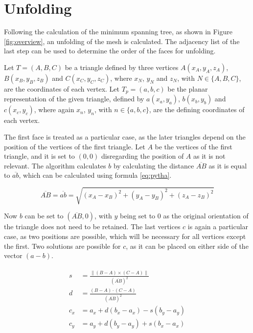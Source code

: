 \documentclass[draft,final]{vutinfth} %
\begin{document}
\section{Unfolding}
\label{sec:unfold}
Following the calculation of the minimum spanning tree, as shown in Figure \ref{fig:overview}, an unfolding of the mesh is calculated. The adjacency list of the last step can be used to determine the order of the faces for unfolding.

Let $T = (A,B,C)$ be a triangle defined by three vertices $A(x_A, y_A, z_A)$, $B(x_B, y_B, z_B)$ and $C(x_C, y_C, z_C)$, where $x_N$, $y_N$ and $z_N$, with $N \in \{A,B,C\}$, are the coordinates of each vertex. Let $T_p = (a, b, c)$ be the planar representation of the given triangle, defined by $a(x_a, y_a)$, $b(x_b, y_b)$ and $c(x_c, y_c)$, where again $x_n$, $y_n$, with $n \in \{a,b,c\}$, are the defining coordinates of each vertex.

The first face is treated as a particular case, as the later triangles depend on the position of the vertices of the first triangle. Let $A$ be the vertices of the first triangle, and it is set to $(0,0)$ disregarding the position of $A$ as it is not relevant. The algorithm calculates $b$ by calculating the distance $\overline{AB}$ as it is equal to $\overline{ab}$, which can be calculated using formula \ref{eq:pytha}.

\begin{equation}
\label{eq:pytha}
\overline{AB} = \overline{ab} = \sqrt{(x_A - x_B)^2 + (y_A - y_B)^2 + (z_A - z_B)^2}
\end{equation}

Now $b$ can be set to $(\overline{AB}, 0)$, with $y$ being set to $0$ as the original orientation of the triangle does not need to be retained. The last vertices $c$ is again a particular case, as two positions are possible, which will be necessary for all vertices except the first. Two solutions are possible for $c$, as it can be placed on either side of the vector $(a-b)$. 

\begin{align}
\label{eq:cone}
\begin{split}
s &= \frac{\|(B - A)\times(C - A)\|}{(\overline{AB})^2}\\
d &= \frac{(B-A)\cdot(C-A)}{(\overline{AB})^2}\\
c_x &= a_x + d(b_x - a_x) - s(b_y - a_y)\\
c_y &= a_y + d(b_y - a_y) + s(b_x - a_x)
\end{split}
\end{align}
\end{document}
